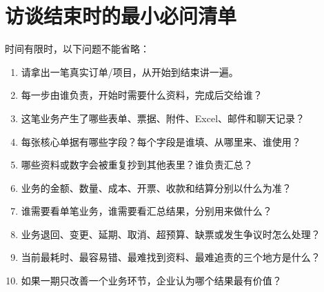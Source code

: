 \documentclass[UTF8,a4paper,11pt]{ctexart}
\begin{document}
\section{访谈结束时的最小必问清单}
时间有限时，以下问题不能省略：
\begin{enumerate}
  \item 请拿出一笔真实订单/项目，从开始到结束讲一遍。
  \item 每一步由谁负责，开始时需要什么资料，完成后交给谁？
  \item 这笔业务产生了哪些表单、票据、附件、Excel、邮件和聊天记录？
  \item 每张核心单据有哪些字段？每个字段是谁填、从哪里来、谁使用？
  \item 哪些资料或数字会被重复抄到其他表里？谁负责汇总？
  \item 业务的金额、数量、成本、开票、收款和结算分别以什么为准？
  \item 谁需要看单笔业务，谁需要看汇总结果，分别用来做什么？
  \item 业务退回、变更、延期、取消、超预算、缺票或发生争议时怎么处理？
  \item 当前最耗时、最容易错、最难找到资料、最难追责的三个地方是什么？
  \item 如果一期只改善一个业务环节，企业认为哪个结果最有价值？
\end{enumerate}
\end{document}
